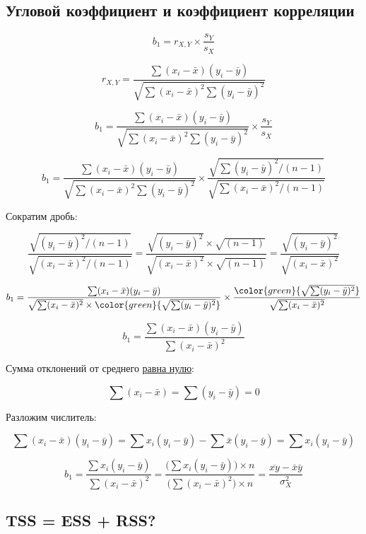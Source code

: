 \documentclass[
  letterpaper,
  DIV=11,
  numbers=noendperiod]{scrreprt}
\theoremstyle{definition}
\theoremstyle{remark}
\begin{document}
\subsection{Угловой коэффициент и коэффициент
корреляции}\label{ux443ux433ux43bux43eux432ux43eux439-ux43aux43eux44dux444ux444ux438ux446ux438ux435ux43dux442-ux438-ux43aux43eux44dux444ux444ux438ux446ux438ux435ux43dux442-ux43aux43eux440ux440ux435ux43bux44fux446ux438ux438}

\[
b_1 = r_{X,Y} \times \frac{s_Y}{s_X}
\]

\[
r_{X,Y} = \frac{\sum (x_i - \bar x)(y_i - \bar y)}{\sqrt{\sum(x_i - \bar x)^2 \sum(y_i - \bar y)^2}}
\]

\[
b_1 = \frac{\sum (x_i - \bar x)(y_i - \bar y)}{\sqrt{\sum(x_i - \bar x)^2 \sum(y_i - \bar y)^2}}
\times
\frac{s_Y}{s_X}
\]

\[
b_1 = \frac{\sum (x_i - \bar x)(y_i - \bar y)}{\sqrt{\sum(x_i - \bar x)^2 \sum(y_i - \bar y)^2}}
\times
\frac{\sqrt{\sum (y_i - \bar y)^2 / (n-1)}}{\sqrt{\sum (x_i - \bar x)^2 / (n-1)}}
\]

Сократим дробь:

\[
\frac{\sqrt{(y_i - \bar y)^2 / (n-1)}}{\sqrt{(x_i - \bar x)^2 / (n-1)}} = 
\frac{\sqrt{(y_i - \bar y)^2} \times \sqrt{(n-1)}}{\sqrt{(x_i - \bar x)^2} \times \sqrt{(n-1)}} = \frac{\sqrt{(y_i - \bar y)^2}}{\sqrt{(x_i - \bar x)^2}}
\]

\[
b_1 = \frac{\sum (x_i - \bar x)(y_i - \bar y)}{\sqrt{\sum(x_i - \bar x)^2} \times \color{green}{\sqrt{\sum(y_i - \bar y)^2}}}
\times
\frac{\color{green}{\sqrt{\sum(y_i - \bar y)^2}}}{\sqrt{\sum(x_i - \bar x)^2}}
\]

\[
b_1 = \frac{\sum (x_i - \bar x)(y_i - \bar y)}{\sum(x_i - \bar x)^2}
\]

Сумма отклонений от среднего \href{}{равна нулю}:

\[
\sum(x_i - \bar x) = \sum (y_i - \bar y) = 0
\]

Разложим числитель:

\[
\sum (x_i - \bar x) (y_i - \bar y) = 
\sum x_i (y_i - \bar y) - \sum \bar x (y_i - \bar y) = 
\sum x_i (y_i - \bar y)
\]

\[
b_1 = \frac{\sum x_i (y_i - \bar y)}{\sum (x_i - \bar x)^2} = 
\frac{\Big( \sum x_i (y_i - \bar y) \Big) \times n}{\Big( \sum (x_i - \bar x)^2 \Big) \times n} = \frac{\overline{xy} - \bar x \bar y}{\sigma_X^2}
\]

\subsection{TSS = ESS + RSS?}\label{tss-ess-rss}
\end{document}
